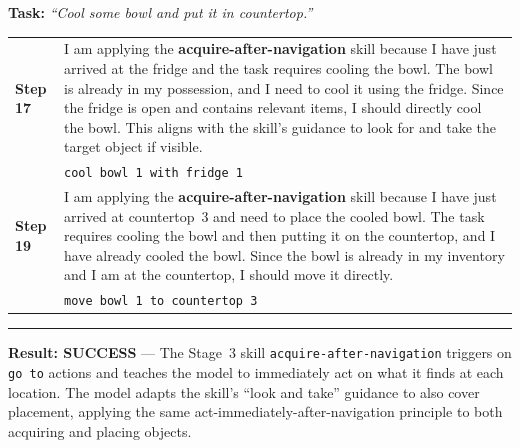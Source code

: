 \documentclass{article}
\theoremstyle{plain}
\theoremstyle{definition}
\theoremstyle{remark}
\begin{document}
\vspace{4pt}

\begin{tcolorbox}[
    colback=white, colframe=stage3color, width=\textwidth, sharp corners,
    boxrule=0.8pt, left=5pt, right=5pt, top=5pt, bottom=5pt,
    title=\textbf{Case 6 (Stage 3, Step 132): Navigation-Driven Action --- acquire-after-navigation},
    fonttitle=\sffamily\small, colbacktitle=stage3color!10, coltitle=black
]
\small

\textbf{Task:} \textit{``Cool some bowl and put it in countertop.''}

\vspace{4pt}
\begin{tabularx}{\linewidth}{@{}p{1.0cm} X@{}}
    \textbf{Step 17} & I am applying the \textbf{\textcolor{skillcolor}{acquire-after-navigation}} skill because I have just arrived at the fridge and the task requires cooling the bowl. The bowl is already in my possession, and I need to cool it using the fridge. Since the fridge is open and contains relevant items, I should directly cool the bowl. This aligns with the skill's guidance to look for and take the target object if visible. \\
    & \texttt{cool bowl 1 with fridge 1} \\
    \midrule
    \textbf{Step 19} & I am applying the \textbf{\textcolor{skillcolor}{acquire-after-navigation}} skill because I have just arrived at countertop~3 and need to place the cooled bowl. The task requires cooling the bowl and then putting it on the countertop, and I have already cooled the bowl. Since the bowl is already in my inventory and I am at the countertop, I should move it directly. \\
    & \texttt{move bowl 1 to countertop 3} \\
\end{tabularx}

\vspace{3pt}\hrule\vspace{3pt}
\textbf{\textcolor{successgreen}{Result: SUCCESS}} --- The Stage~3 skill \texttt{acquire-after-navigation} triggers on \texttt{go to} actions and teaches the model to immediately act on what it finds at each location. The model adapts the skill's ``look and take'' guidance to also cover placement, applying the same act-immediately-after-navigation principle to both acquiring and placing objects.
\end{tcolorbox}
\end{document}
